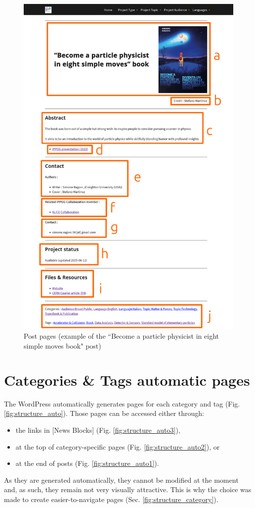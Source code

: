 \begin{figure}[p]
    \centering
    \includegraphics[width=.85\linewidth]{Image/Architecture/structure_project.png}
    \caption{Post pages (example of the “Become a particle physicist in eight simple moves book" post)}
    \label{fig:structure_post}
\end{figure}
\newpage

\section{Categories \& Tags automatic pages}\label{sec:structure_auto}

The WordPress automatically generates pages for each category and tag (Fig. \ref{fig:structure_auto}). Those pages can be accessed either through: 
\begin{itemize}
    \item the links in [News Blocks] (Fig. \ref{fig:structure_auto3}),
    \item at the top of category-specific pages (Fig. \ref{fig:structure_auto2}), or
    \item at the end of posts (Fig. \ref{fig:structure_auto1}).
\end{itemize}   
As they are generated automatically, they cannot be modified at the moment and, as such, they remain not very visually attractive. This is why the choice was made to create easier-to-navigate pages (Sec. \ref{fig:structure_category}).

